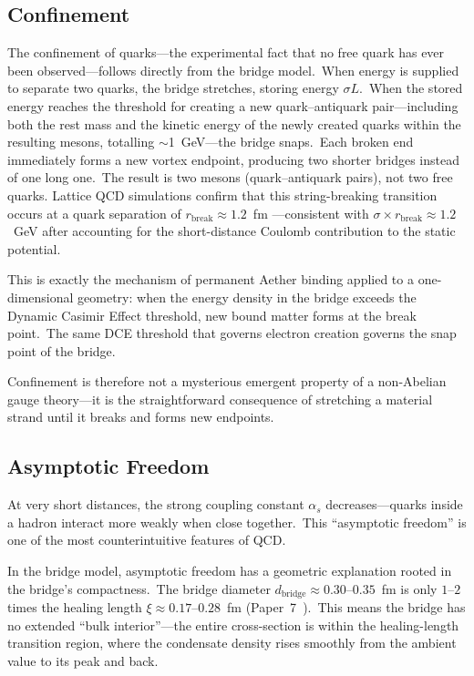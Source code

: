 ﻿\documentclass[12pt,letterpaper]{article}
\begin{document}
\subsection{Confinement}

The confinement of quarks---the experimental fact that no free quark has ever been
observed---follows directly from the bridge model.\ When energy is supplied to separate
two quarks, the bridge stretches, storing energy $\sigma L$.\ When the stored energy
reaches the threshold for creating a new quark--antiquark pair---including both the
rest mass and the kinetic energy of the newly created quarks within the resulting
mesons, totalling $\sim$1~GeV---the bridge snaps.\ Each broken end
immediately forms a new vortex endpoint, producing two shorter bridges instead of
one long one.\ The result is two mesons (quark--antiquark pairs), not two free quarks.
Lattice QCD simulations confirm that this string-breaking transition occurs at a
quark separation of $r_{\mathrm{break}} \approx 1.2$~fm
\cite{bali2005,bulava2019}---consistent with $\sigma \times r_{\mathrm{break}}
\approx 1.2$~GeV after accounting for the short-distance Coulomb contribution
to the static potential.

This is exactly the mechanism of permanent Aether binding applied to a one-dimensional
geometry: when the energy density in the bridge exceeds the Dynamic Casimir Effect
threshold, new bound matter forms at the break point.\ The same DCE threshold that
governs electron creation governs the snap point of the bridge.

Confinement is therefore not a mysterious emergent property of a non-Abelian gauge
theory---it is the straightforward consequence of stretching a material strand until
it breaks and forms new endpoints.


\subsection{Asymptotic Freedom}

At very short distances, the strong coupling constant $\alpha_s$ decreases---quarks
inside a hadron interact more weakly when close together.\ This ``asymptotic freedom''
is one of the most counterintuitive features of QCD.

In the bridge model, asymptotic freedom has a geometric explanation rooted in the
bridge's compactness.\ The bridge diameter
$d_{\mathrm{bridge}} \approx 0.30$--$0.35$~fm is only $1$--$2$ times the healing
length $\xi \approx 0.17$--$0.28$~fm
(Paper~7~\cite{otto-quantum}).\ This means the bridge has no extended
``bulk interior''---the entire cross-section is within the healing-length
transition region, where the condensate density rises smoothly from the ambient
value to its peak and back.
\end{document}
